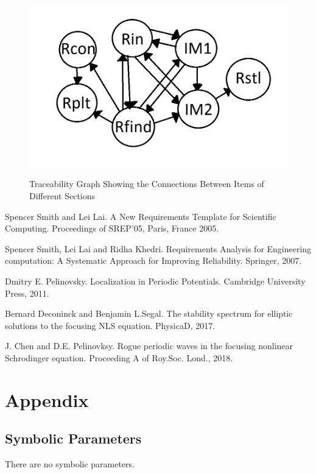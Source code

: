 \documentclass[12pt]{article}
\begin{document}
\begin{figure}[h!]
	\begin{center}
		{
			\includegraphics[width=\textwidth]{RTrace.png}
		}
 		\caption{\label{Fig_RTrace} Traceability Graph Showing the Connections 
 			Between Items of Different Sections}
	\end{center}
\end{figure}




\clearpage 
\begin{thebibliography}{9} 
	Spencer Smith and Lei Lai. 
	A New Requirements Template for Scientific Computing. 
	Proceedings of SREP'05, Paris, France 2005. 
	
	Spencer Smith, Lei Lai and Ridha Khedri. 
	Requirements Analysis for Engineering computation: A Systematic Approach 
	for Improving Reliability. 
	Springer, 2007. 
	
	Dmitry E. Pelinovsky. 
	Localization in Periodic Potentials. 
	Cambridge University Press, 2011. 
	
	Bernard Deconinck and Benjamin L.Segal. 
	The stability spectrum for elliptic solutions to the focusing NLS equation. 
	PhysicaD, 2017.  
	
	J. Chen and D.E. Pelinovksy. 
	Rogue periodic waves in the focusing nonlinear Schrodinger equation. 
	Proceeding A of Roy.Soc. Lond., 2018. 
	
\end{thebibliography} 

\newpage

\section{Appendix}

\subsection{Symbolic Parameters}

There are no symbolic parameters.
\end{document}
